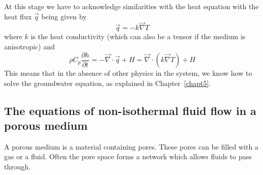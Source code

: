 At this stage we have to acknowledge similarities with the heat equation
with the heat flux $\vec{q}$ being given by
\[
\vec{q} = - k \vec\nabla T
\]
where $k$ is the heat conductivity (which can also be a tensor if the medium is anisotropic)
and 
\[
\rho C_p \frac{\partial h}{\partial t} = - \vec\nabla\cdot \vec{q} + H = \vec\nabla \cdot (k\vec\nabla T )+ H 
\]
This means that in the absence of other physics in the system, we know how to solve the groundwater equation,
as explained in Chapter~\ref{chapt5}.



\subsection{The equations of non-isothermal fluid flow in a porous medium}

A porous medium is a material containing pores. These pores can 
be filled with a gas or a fluid. Often the pore space forms a network which allows fluids to pass through.

